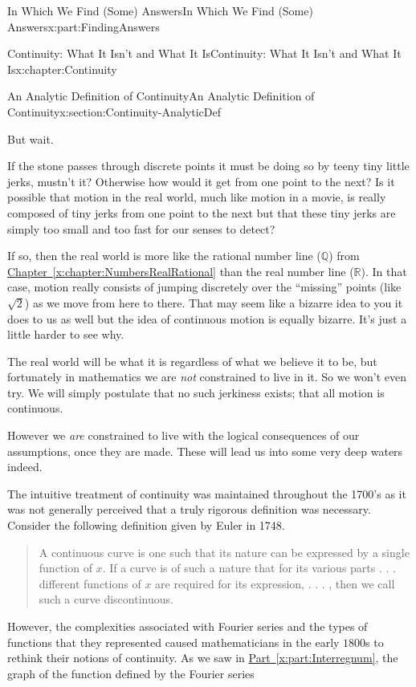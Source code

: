 \documentclass[oneside,10pt,]{book}
\newcommand{\xreffont}{\relax}
\numberwithin{equation}{section}
\newcommand{\RR}{\mathbb {R}}
\newcommand{\QQ}{\mathbb {Q}}
\begin{document}
\begin{partptx}{In Which We Find (Some) Answers}{}{In Which We Find (Some) Answers}{}{}{x:part:FindingAnswers}
\begin{chapterptx}{Continuity: What It Isn't and What It Is}{}{Continuity: What It Isn't and What It Is}{}{}{x:chapter:Continuity}
\begin{sectionptx}{An Analytic Definition of Continuity}{}{An Analytic Definition of Continuity}{}{}{x:section:Continuity-AnalyticDef}
\par
But wait.%
\par
If the stone passes through discrete points it must be doing so by teeny tiny little jerks, mustn't it?  Otherwise how would it get from one point to the next?  Is it possible that motion in the real world, much like motion in a movie, is really composed of tiny jerks from one point to the next but that these tiny jerks are simply too small and too fast for our senses to detect?%
\par
If so, then the real world is more like the rational number line (\(\QQ\)) from \hyperref[x:chapter:NumbersRealRational]{Chapter~{\xreffont\ref{x:chapter:NumbersRealRational}}} than the real number line (\(\RR\)).  In that case, motion really consists of jumping discretely over the ``missing'' points (like \(\sqrt{2}\)) as we move from here to there. That may seem like a bizarre idea to you \textemdash{} it does to us as well \textemdash{} but the idea of continuous motion is equally bizarre.  It's just a little harder to see why.%
\par
The real world will be what it is regardless of what we believe it to be, but fortunately in mathematics we are \emph{not} constrained to live in it.  So we won't even try.  We will simply postulate that no such jerkiness exists; that all motion is continuous.%
\par
However we \emph{are} constrained to live with the logical consequences of our assumptions, once they are made.  These will lead us into some very deep waters indeed.%
\par
The intuitive treatment of continuity was maintained throughout the 1700's as it was not generally perceived that a truly rigorous definition was necessary.  Consider the following definition given by Euler in 1748.%
\begin{quote}%
A continuous curve is one such that its nature can be expressed by a single function of \(x.\) If a curve is of such a nature that for its various parts . . . different functions of \(x\) are required for its expression, . . . , then we call such a curve discontinuous.%
\end{quote}
However, the complexities associated with Fourier series and the types of functions that they represented caused mathematicians in the early \(1800\)s to rethink their notions of continuity.  As we saw in \hyperref[x:part:Interregnum]{Part~{\xreffont\ref{x:part:Interregnum}}}, the graph of the function defined by the Fourier series%
\begin{equation*}

\end{equation*}
\end{sectionptx}
\end{chapterptx}
\end{partptx}
\end{document}
